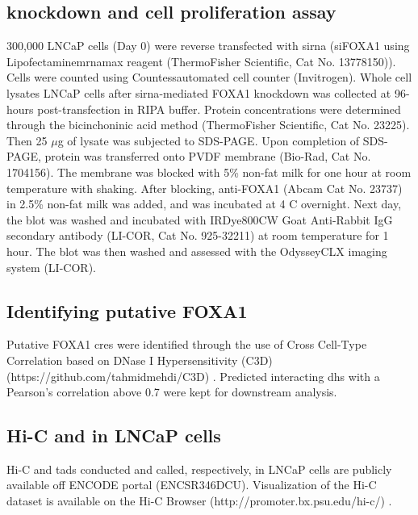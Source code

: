 \subsection{ knockdown and cell proliferation assay}

300,000 LNCaP cells (Day 0) were reverse transfected with \gls{sirna} (siFOXA1 using Lipofectamine\textregistered \gls{mrna}max reagent (ThermoFisher Scientific, Cat No. 13778150)).
Cells were counted using Countess\texttrademark automated cell counter (Invitrogen).
Whole cell lysates LNCaP cells after \gls{sirna}-mediated FOXA1 knockdown was collected at 96-hours post-transfection in RIPA buffer.
Protein concentrations were determined through the bicinchoninic acid method (ThermoFisher Scientific, Cat No. 23225).
Then 25 $\mu$g of lysate was subjected to SDS-PAGE.
Upon completion of SDS-PAGE, protein was transferred onto PVDF membrane (Bio-Rad, Cat No. 1704156).
The membrane was blocked with 5\% non-fat milk for one hour at room temperature with shaking.
After blocking, anti-FOXA1 (Abcam Cat No. 23737) in 2.5\% non-fat milk was added, and was incubated at 4 \textdegree C overnight.
Next day, the blot was washed and incubated with IRDye\textregistered 800CW Goat Anti-Rabbit IgG secondary antibody (LI-COR, Cat No. 925-32211) at room temperature for 1 hour.
The blot was then washed and assessed with the Odyssey\textregistered CLX imaging system (LI-COR).

\subsection{Identifying putative FOXA1 }

Putative FOXA1 \glspl{cre} were identified through the use of Cross Cell-Type Correlation based on DNase I Hypersensitivity (C3D) (https://github.com/tahmidmehdi/C3D) \cite{mehdiC3DToolPredict2019}.
Predicted interacting \gls{dhs} with a Pearson's correlation above 0.7 \cite{thurmanAccessibleChromatinLandscape2012} were kept for downstream analysis.

\subsection{Hi-C and  in LNCaP cells}

Hi-C and \glspl{tad} conducted and called, respectively, in LNCaP cells are publicly available off ENCODE portal (ENCSR346DCU).
Visualization of the Hi-C dataset is available on the Hi-C Browser (http://promoter.bx.psu.edu/hi-c/) \cite{wang3DGenomeBrowser2018}.

